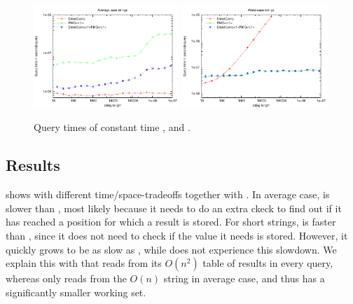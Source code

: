 \documentclass[a4]{article}
\newcommand*{\pref}{\prettyref}
\begin{document}
\begin{figure}[tp]
    \begin{center}
        \includegraphics[width=0.49\textwidth,type=pdf,ext=.pdf,read=.pdf]{../src/results/length-rmq-directcomp-rand10.plt}
        \includegraphics[width=0.49\textwidth,type=pdf,ext=.pdf,read=.pdf]{../src/results/length-rmq-directcomp-alla.plt}
    \end{center}
    \caption{\label{fig:plot-rmq-directcomp}Query times of constant time ,  and .}
\end{figure}

\subsection{ Results}


\pref{fig:plot-complookup} shows  with different time/space-tradeoffs together with . In average case,  is slower than , most likely because it needs to do an extra ckeck to find out if it has reached a position for which a result is stored. For short strings,  is faster than , since it does not need to check if the value it needs is stored. However, it quickly grows to be as slow as , while  does not experience this slowdown. We explain this with that  reads from its $O(n^2)$ table of results in every query, whereas  only reads from the $O(n)$ string in average case, and thus has a significantly smaller working set.
\end{document}
